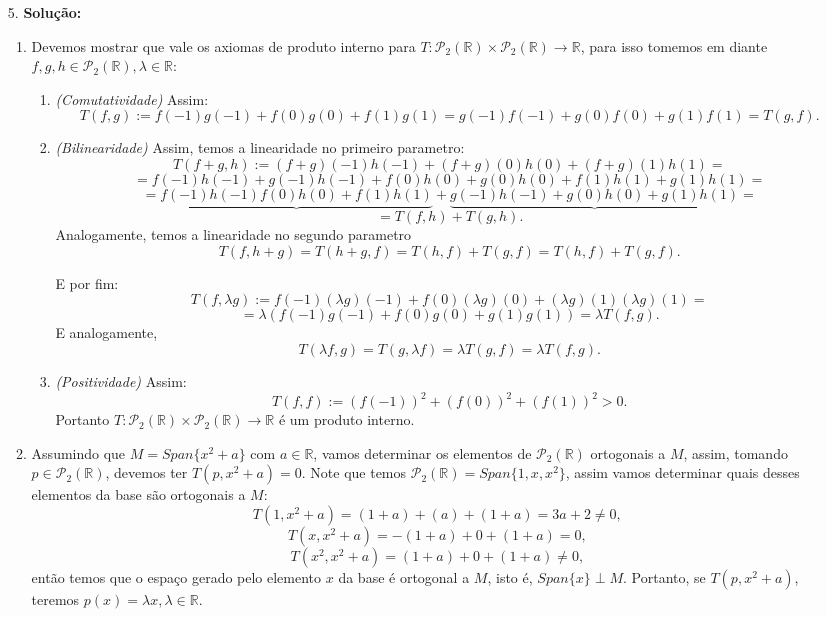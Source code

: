 \documentclass{article}
\begin{document}
\begin{enumerate}
		\item[5.] \textbf{Solução:}
			\begin{enumerate}
				\item Devemos mostrar que vale os axiomas de produto interno para $T: \mathcal{P}_{2}(\mathbb{R}) \times \mathcal{P}_{2}(\mathbb{R}) \to \mathbb{R}$, para isso tomemos em diante $f,g,h \in \mathcal{P}_{2}(\mathbb{R}), \lambda \in \mathbb{R}$:
					\begin{enumerate}
						\item \textit{(Comutatividade)} Assim: 
						$$
						T(f, g):= f(-1)g(-1) + f(0)g(0) + f(1)g(1) = g(-1)f(-1) + g(0)f(0) + g(1)f(1) = T(g, f).
						$$
						
						\item \textit{(Bilinearidade)} Assim, temos a linearidade no primeiro parametro: 
						$$
						T(f+g, h) := (f+g)(-1)h(-1) +(f+g)(0)h(0)+(f+g)(1)h(1) =  
						$$
						$$
						= f(-1)h(-1)+g(-1)h(-1) +f(0)h(0)+g(0)h(0)+f(1)h(1)+g(1)h(1)=
						$$ 
						$$
						= \underbrace{f(-1)h(-1)f(0)h(0)+f(1)h(1)}+\underbrace{g(-1)h(-1) +g(0)h(0)+g(1)h(1)}=
						$$
						$$
						= T(f, h) + T(g,h).
						$$
						Analogamente, temos a linearidade no segundo parametro 
						$$
						T(f, h+g) = T(h+g, f) = T(h, f) + T(g, f) = T(h, f) + T(g, f).
						$$
						
						E por fim:
						$$
						T(f, \lambda g):= f(-1)(\lambda g)(-1) + f(0)(\lambda g)(0) + (\lambda g)(1)(\lambda g)(1) =
						$$
						$$
						=\lambda (f(-1)g(-1) + f(0)g(0) + g(1)g(1)) = \lambda T(f, g).
						$$
						E analogamente, 
						$$
						T(\lambda f, g) = T(g, \lambda f) = \lambda T(g,f) = \lambda T(f,g).
						$$
						
						\item \textit{(Positividade)} Assim:
						$$
						T(f,f) := (f(-1))^{2} + (f(0))^{2}+ (f(1))^{2}>0.
						$$
						Portanto $T: \mathcal{P}_{2}(\mathbb{R}) \times \mathcal{P}_{2}(\mathbb{R}) \to \mathbb{R}$ é um produto interno.
					\end{enumerate}
					
					\item Assumindo que $M = Span\{x^{2}+a\}$ com $a \in \mathbb{R}$, vamos determinar os elementos de $\mathcal{P}_{2}(\mathbb{R})$ ortogonais a $M$, assim, tomando $p \in \mathcal{P}_{2}(\mathbb{R})$, devemos ter $T(p, x^{2}+a)=0$. Note que temos $\mathcal{P}_{2}(\mathbb{R}) = Span\{1, x, x^{2}\}$, assim vamos determinar quais desses elementos da base são ortogonais a $M$:
					$$
					T(1, x^{2}+a) = (1+a)+(a)+(1+a)= 3a+2 \neq 0,
					$$
					$$
					T(x, x^{2}+a) = -(1+a)+0+(1+a)=0,
					$$
					$$
					T(x^{2}, x^{2}+a) = (1+a)+0+(1+a) \neq 0,
					$$
					então temos que o espaço gerado pelo elemento $x$ da base é ortogonal a $M$, isto é, $Span\{x\}\perp M$. Portanto, se $T(p, x^{2}+a)$, teremos $p(x)=\lambda x, \lambda \in \mathbb{R}$.
				
					
			\end{enumerate}
		
		
	\end{enumerate}
		
\end{document}
